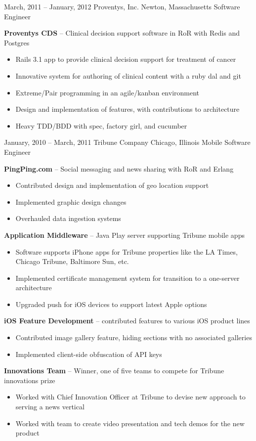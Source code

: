 \documentclass[]{friggeri-cv}
\begin{document}
\begin{entrylist}
    \entryalt
    {March, 2011 -- January, 2012}
    {Proventys, Inc.}
    {Newton, Massachusetts}
    {Software Engineer}
    {\textbf{Proventys CDS} -- Clinical decision support software in RoR with Redis and Postgres
    \begin{itemize}
      \item Rails 3.1 app to provide clinical decision support for treatment of cancer
      \item Innovative system for authoring of clinical content with a ruby dal and git
      \item Extreme/Pair programming in an agile/kanban environment
      \item Design and implementation of features, with contributions to architecture
      \item Heavy TDD/BDD with spec, factory girl, and cucumber     
    \end{itemize}}
    
    \entryalt
    {January, 2010 -- March, 2011}
    {Tribune Company}
    {Chicago, Illinois}
    {Mobile Software Engineer}
    {\textbf{PingPing.com} -- Social messaging and news sharing with RoR and Erlang
    \begin{itemize}
      \item Contributed design and implementation of geo location support
      \item Implemented graphic design changes
      \item Overhauled data ingestion systems
    \end{itemize}
    \textbf{Application Middleware} -- Java Play server supporting Tribune mobile apps
    \begin{itemize}
      \item Software supports iPhone apps for Tribune properties like the LA Times, Chicago Tribune, Baltimore Sun, etc.
      \item Implemented certificate management system for transition to a one-server architecture
      \item Upgraded push for iOS devices to support latest Apple options
    \end{itemize}
    \textbf{iOS Feature Development} -- contributed features to various iOS product lines
    \begin{itemize}
      \item Contributed image gallery feature, hiding sections with no associated galleries
      \item Implemented client-side obfuscation of API keys
    \end{itemize}
    \textbf{Innovations Team} -- Winner, one of five teams to compete for Tribune innovations prize
    \begin{itemize}
      \item Worked with Chief Innovation Officer at Tribune to devise new approach to serving a news vertical
      \item Worked with team to create video presentation and tech demos for the new product
    \end{itemize}}


\end{entrylist}
\end{document}
